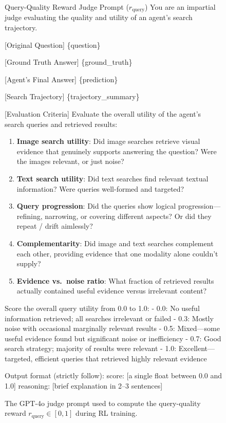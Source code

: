 \begin{figure}[H]
\centering
\begin{promptbox}[promptplum]{Query-Quality Reward Judge Prompt ($r_{\mathrm{query}}$)}
You are an impartial judge evaluating the quality and utility of an agent's search trajectory.

[Original Question]
\{question\}

[Ground Truth Answer]
\{ground\_truth\}

[Agent's Final Answer]
\{prediction\}

[Search Trajectory]
\{trajectory\_summary\}

[Evaluation Criteria]
Evaluate the overall utility of the agent's search queries and retrieved results:

\begin{enumerate}[leftmargin=*,nosep]
\item \textbf{Image search utility}: Did image searches retrieve visual evidence that genuinely supports answering the question? Were the images relevant, or just noise?
\item \textbf{Text search utility}: Did text searches find relevant textual information? Were queries well-formed and targeted?
\item \textbf{Query progression}: Did the queries show logical progression---refining, narrowing, or covering different aspects? Or did they repeat / drift aimlessly?
\item \textbf{Complementarity}: Did image and text searches complement each other, providing evidence that one modality alone couldn't supply?
\item \textbf{Evidence vs.\ noise ratio}: What fraction of retrieved results actually contained useful evidence versus irrelevant content?
\end{enumerate}

Score the overall query utility from 0.0 to 1.0:
- 0.0: No useful information retrieved; all searches irrelevant or failed
- 0.3: Mostly noise with occasional marginally relevant results
- 0.5: Mixed---some useful evidence found but significant noise or inefficiency
- 0.7: Good search strategy; majority of results were relevant
- 1.0: Excellent---targeted, efficient queries that retrieved highly relevant evidence

Output format (strictly follow):
score: [a single float between 0.0 and 1.0]
reasoning: [brief explanation in 2--3 sentences]
\end{promptbox}
\caption{The GPT-4o judge prompt used to compute the query-quality reward $r_{\text{query}} \in [0,1]$ during RL training.}
\label{apdxfig:query-judge}
\end{figure}

